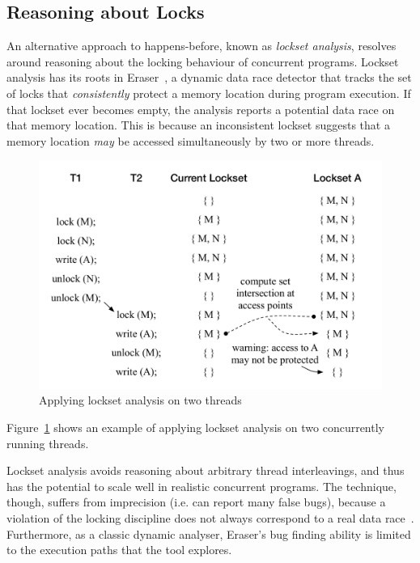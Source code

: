 \subsection{Reasoning about Locks}
\label{bg:lockset}

An alternative approach to happens-before, known as \emph{lockset analysis}, resolves around reasoning about the locking behaviour of concurrent programs. Lockset analysis has its roots in Eraser~\cite{savage1997eraser}, a dynamic data race detector that tracks the set of locks that \emph{consistently} protect a memory location during program execution. If that lockset ever becomes empty, the analysis reports a potential data race on that memory location. This is because an inconsistent lockset suggests that a memory location \emph{may} be accessed simultaneously by two or more threads.

\begin{figure}[htbp]
\centering
\includegraphics[width=1\linewidth]{img/lockset.pdf}
\caption{Applying lockset analysis on two threads}
\label{fig:locksets}
\end{figure}

Figure~\ref{fig:locksets} shows an example of applying lockset analysis on two concurrently running threads.

Lockset analysis avoids reasoning about arbitrary thread interleavings, and thus has the potential to scale well in realistic concurrent programs. The technique, though, suffers from imprecision (i.e. can report many false bugs), because a violation of the locking discipline does not always correspond to a real data race~\cite{savage1997eraser, pozniansky2003efficient, o2003hybrid, elmas2007goldilocks, flanagan2009fasttrack}. Furthermore, as a classic dynamic analyser, Eraser's bug finding ability is limited to the execution paths that the tool explores.